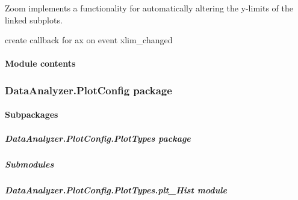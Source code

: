 \documentclass[letterpaper,10pt,english]{sphinxmanual}
\begin{document}
\begin{fulllineitems}
\label{\detokenize{DataAnalyzer.Plot:DataAnalyzer.Plot.cl_zoom.Zoom}}
Zoom implements a functionality for automatically altering the y-limits of the linked subplots.

create callback for ax on event xlim\_changed

\end{fulllineitems}



\paragraph{Module contents}
\label{\detokenize{DataAnalyzer.Plot:module-DataAnalyzer.Plot}}\label{\detokenize{DataAnalyzer.Plot:module-contents}}

\subsubsection{DataAnalyzer.PlotConfig package}
\label{\detokenize{DataAnalyzer.PlotConfig:dataanalyzer-plotconfig-package}}\label{\detokenize{DataAnalyzer.PlotConfig::doc}}

\paragraph{Subpackages}
\label{\detokenize{DataAnalyzer.PlotConfig:subpackages}}

\subparagraph{DataAnalyzer.PlotConfig.PlotTypes package}
\label{\detokenize{DataAnalyzer.PlotConfig.PlotTypes:dataanalyzer-plotconfig-plottypes-package}}\label{\detokenize{DataAnalyzer.PlotConfig.PlotTypes::doc}}

\subparagraph{Submodules}
\label{\detokenize{DataAnalyzer.PlotConfig.PlotTypes:submodules}}

\subparagraph{DataAnalyzer.PlotConfig.PlotTypes.plt\_Hist module}
\label{\detokenize{DataAnalyzer.PlotConfig.PlotTypes:module-DataAnalyzer.PlotConfig.PlotTypes.plt_Hist}}\label{\detokenize{DataAnalyzer.PlotConfig.PlotTypes:dataanalyzer-plotconfig-plottypes-plt-hist-module}}
\end{document}
